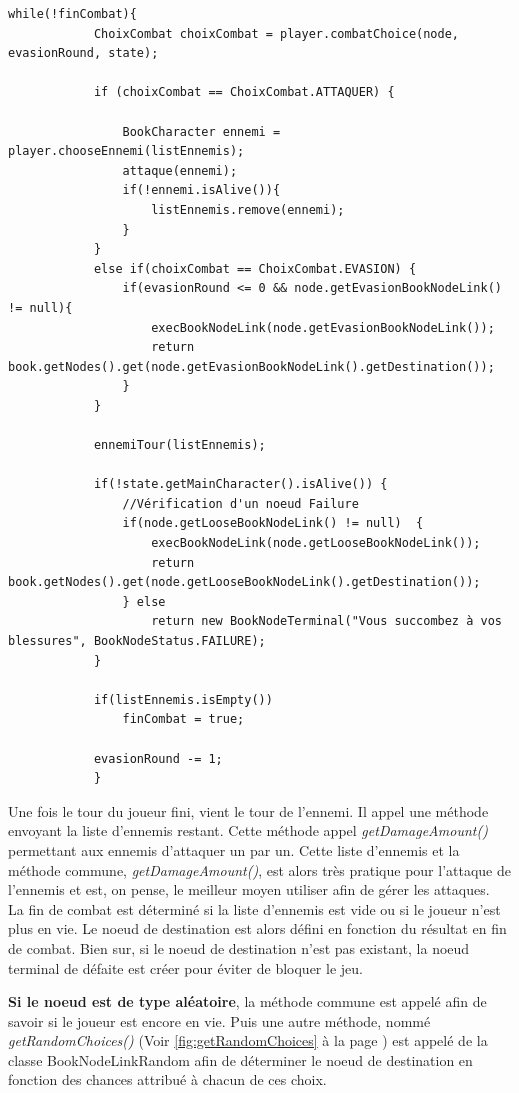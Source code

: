 		\begin{lstlisting}[caption=JeuCombat]
		while(!finCombat){
			ChoixCombat choixCombat = player.combatChoice(node, evasionRound, state);

			if (choixCombat == ChoixCombat.ATTAQUER) {

				BookCharacter ennemi = player.chooseEnnemi(listEnnemis);
				attaque(ennemi);
				if(!ennemi.isAlive()){
					listEnnemis.remove(ennemi);
				}
			}
			else if(choixCombat == ChoixCombat.EVASION) {
				if(evasionRound <= 0 && node.getEvasionBookNodeLink() != null){
					execBookNodeLink(node.getEvasionBookNodeLink());
					return book.getNodes().get(node.getEvasionBookNodeLink().getDestination());
				}
			}

			ennemiTour(listEnnemis);

			if(!state.getMainCharacter().isAlive()) {
				//Vérification d'un noeud Failure
				if(node.getLooseBookNodeLink() != null)  {
					execBookNodeLink(node.getLooseBookNodeLink());
					return book.getNodes().get(node.getLooseBookNodeLink().getDestination());
				} else
					return new BookNodeTerminal("Vous succombez à vos blessures", BookNodeStatus.FAILURE);
			}

			if(listEnnemis.isEmpty())
				finCombat = true;

			evasionRound -= 1;
			}
		\end{lstlisting}

		Une fois le tour du joueur fini, vient le tour de l'ennemi. Il appel une méthode envoyant la liste d'ennemis restant. Cette méthode appel \textit{getDamageAmount()} permettant aux ennemis d'attaquer un par un. Cette liste d'ennemis et la méthode commune, \textit{getDamageAmount()}, est alors très pratique pour l'attaque de l'ennemis et est, on pense, le meilleur moyen utiliser afin de gérer les attaques.\\

		La fin de combat est déterminé si la liste d'ennemis est vide ou si le joueur n'est plus en vie. Le noeud de destination est alors défini en fonction du résultat en fin de combat. Bien sur, si le noeud de destination n'est pas existant, la noeud terminal de défaite est créer pour éviter de bloquer le jeu.

		\textbf{Si le noeud est de type aléatoire}, la méthode commune est appelé afin de savoir si le joueur est encore en vie. Puis une autre méthode, nommé \textit{getRandomChoices()} (Voir \ref{fig:getRandomChoices} à la page \pageref{fig:getRandomChoices}) est appelé de la classe BookNodeLinkRandom afin de déterminer le noeud de destination en fonction des chances attribué à chacun de ces choix.

